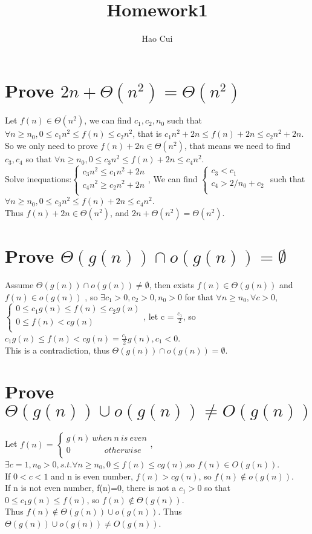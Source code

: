 \documentclass{article}
\title{Homework1}
\author{Hao Cui}
\begin{document}
\maketitle
\section{Prove $2n+\Theta(n^2)=\Theta(n^2)$}
Let $f(n)\in\Theta(n^2)$, we can find $c_1,c_2,n_0$ such that $\forall n\ge n_0, 0\le c_1n^2 \le f(n) \le c_2n^2$, that is
$c_1n^2 + 2n \le f(n)+2n \le c_2n^2+2n$.\\
So we only need to prove $f(n)+2n\in \Theta(n^2)$, that means we need to find $c_3,c_4$ so that $\forall n\ge n_0, 0\le c_3n^2 \le f(n)+ 2n \le c_4n^2$.\\
Solve inequations:$
\left\{
\begin{aligned}
c_3n^2 \le c_1n^2 + 2n \\
c_4n^2 \ge c_2n^2+2n \\
\end{aligned}\right.$,
We can find $
\left\{
\begin{aligned}
c_3<c_1 \\
c_4>2/n_0 + c_2 \\
\end{aligned}\right. $ such that $\forall n\ge n_0, 0\le c_3n^2 \le f(n)+ 2n \le c_4n^2$.\\
Thus $f(n)+2n\in \Theta(n^2)$, and $2n+\Theta(n^2)=\Theta(n^2)$.
\section{Prove $\Theta(g(n))\cap o(g(n))=\emptyset$}
Assume $\Theta(g(n))\cap o(g(n))\neq\emptyset$, then exists $f(n) \in\Theta(g(n))$ and $f(n)\in o(g(n))$ ,
so $\exists c_1>0,c_2>0,n_0>0$ for that $\forall n \ge n_0,\forall c>0$,$
\left\{
\begin{aligned}
0\le c_1g(n) \le f(n) \le c_2g(n) \\
0\le f(n) < cg(n) \\
\end{aligned}\right.$,
let c = $\frac{c_1}{2}$, so $c_1g(n)\le f(n)<cg(n)=\frac{c_1}{2}g(n), c_1 < 0$.\\
This is a contradiction, thus $\Theta(g(n))\cap o(g(n))=\emptyset$.
\section{Prove $\Theta(g(n))\cup o(g(n))\neq O(g(n))$}
Let $
f(n)=\left\{
\begin{aligned}
g(n) \ when\ n\ is\ even  \\
0  \qquad \qquad otherwise\\
\end{aligned}\right.$,
$\exists c=1, n_0>0, s.t. \forall n\ge n_0,0\le f(n)\le cg(n)$,so $f(n)\in O(g(n))$.\\
If $0<c<1$ and n is even number, $f(n)>cg(n)$, so $f(n)\notin o(g(n))$.\\
If n is not even number, f(n)=0, there is not a $c_1>0$ so that $0\le c_1g(n) \le f(n)$, so $f(n)\notin \Theta(g(n))$.\\
Thus $f(n)\notin \Theta(g(n))\cup o(g(n))$.
Thus $\Theta(g(n))\cup o(g(n))\neq O(g(n))$.
\end{document}
